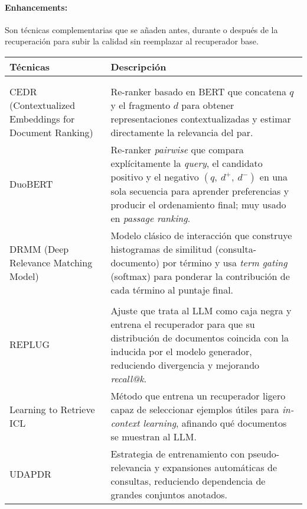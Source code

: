 \paragraph{Enhancements:} Son técnicas complementarias que se añaden antes, durante o después de la recuperación para subir la calidad sin reemplazar al 
recuperador base.
\begin{tabularx}{\textwidth}{>{\raggedright\arraybackslash}p{} X}
\toprule
\textbf{Técnicas} & \textbf{Descripción} \\
\midrule
\endfirsthead

\endhead

\bottomrule
\caption{Técnicas de Enhancements }\label{tab:enhancementstechnics}\\
\endlastfoot

\multicolumn{2}{l}{\textit{Reranking}}\\
CEDR (Contextualized Embeddings for Document Ranking) &
Re-ranker basado en BERT que concatena $q$ y el fragmento $d$ para obtener representaciones contextualizadas y estimar directamente la relevancia del par. \\
DuoBERT &
Re-ranker \textit{pairwise} que compara explícitamente la \emph{query}, el candidato positivo y el negativo \((q,\ d^{+},\ d^{-})\) en una sola secuencia para aprender preferencias y producir el ordenamiento final; muy usado en \textit{passage ranking}. \\
DRMM (Deep Relevance Matching Model) &
Modelo clásico de interacción que construye histogramas de similitud (consulta-documento) por término y usa \textit{term gating} (softmax) para ponderar la contribución de cada término al puntaje final. \\

\midrule
\multicolumn{2}{l}{\textit{Retriever Finetuning}}\\
REPLUG &
Ajuste que trata al LLM como caja negra y entrena el recuperador para que su distribución de documentos coincida con la inducida por el modelo generador, reduciendo divergencia y mejorando \textit{recall@k}. \\
Learning to Retrieve ICL &
Método que entrena un recuperador ligero capaz de seleccionar ejemplos útiles para \textit{in-context learning}, afinando qué documentos se muestran al LLM. \\
UDAPDR &
Estrategia de entrenamiento con pseudo-relevancia y expansiones automáticas de consultas, reduciendo dependencia de grandes conjuntos anotados. \\


\end{tabularx}
